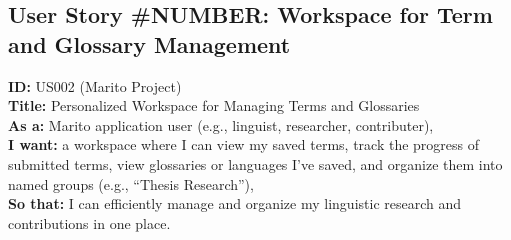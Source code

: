 \subsection{User Story \#NUMBER: Workspace for Term and Glossary Management}

\textbf{ID:} US002 (Marito Project) \\
\textbf{Title:} Personalized Workspace for Managing Terms and Glossaries \\
\textbf{As a:} Marito application user (e.g., linguist, researcher, contributer), \\
\textbf{I want:} a workspace where I can view my saved terms, track the progress of submitted terms, view glossaries or languages I've saved, and organize them into named groups (e.g., ``Thesis Research''), \\
\textbf{So that:} I can efficiently manage and organize my linguistic research and contributions in one place.


